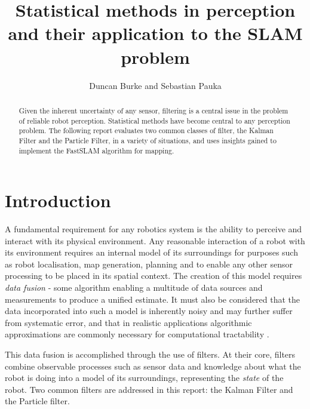 \documentclass[english]{article}
\begin{document}
\title{Statistical methods in perception and their application to the SLAM problem}

\author{Duncan Burke and Sebastian Pauka}
\maketitle

\begin{abstract}
Given the inherent uncertainty of any sensor, filtering is a central issue in the problem of reliable robot perception. Statistical methods have become central to any perception problem. The following report evaluates two common classes of filter, the Kalman Filter and the Particle Filter, in a variety of situations, and uses insights gained to implement the FastSLAM algorithm for mapping.
\end{abstract}

\section{Introduction}
A fundamental requirement for any robotics system is the ability to perceive and interact with its physical environment. Any reasonable interaction of a robot with its environment requires an internal model of its surroundings for purposes such as robot localisation, map generation, planning and to enable any other sensor processing to be placed in its spatial context. The creation of this model requires \emph{data fusion} - some algorithm  enabling a multitude of data sources and measurements to produce a unified estimate. It must also be considered that the data incorporated into such a model is inherently noisy and may further suffer from systematic error, and that in realistic applications algorithmic approximations are commonly necessary for computational tractability \cite{probrob}.

This data fusion is accomplished through the use of filters. At their core, filters combine observable processes such as sensor data and knowledge about what the robot is doing into a model of its surroundings, representing the \emph{state} of the robot. Two common filters are addressed in this report: the Kalman Filter and the Particle filter.
\end{document}
